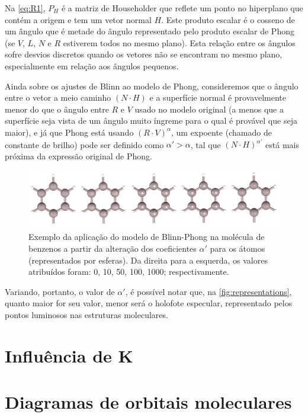 Na \autoref{eq:R1}, $P_H$ é a matriz de Householder que reflete um ponto no hiperplano que contém a origem e tem um vetor normal $H$. Este produto escalar é o cosseno de um ângulo que é metade do ângulo representado pelo produto escalar de Phong (se $V$, $L$, $N$ e $R$ estiverem todos no mesmo plano). Esta relação entre os ângulos sofre desvios discretos quando os vetores não se encontram no mesmo plano, especialmente em relação aos ângulos pequenos.

Ainda sobre os ajustes de Blinn ao modelo de Phong, consideremos que o ângulo entre o vetor a meio caminho $(N \cdot H)$ e a superfície normal é provavelmente menor do que o ângulo entre $R$ e $V$ usado no modelo original (a menos que a superfície seja vista de um ângulo muito íngreme para o qual é provável que seja maior), e já que Phong está usando $(R \cdot V)^\alpha$, um expoente (chamado de constante de brilho) pode ser definido como $\alpha' > \alpha$, tal que $(N \cdot H)^{\alpha'}$ está mais próxima da expressão original de Phong.

\begin{figure}[htb]
\caption{\label{fig:representations} Exemplo da aplicação do modelo de Blinn-Phong na molécula de benzenos a partir da alteração dos coeficientes $\alpha'$ para os átomos (representados por esferas). Da direita para a esquerda, os valores atribuídos foram: 0, 10, 50, 100, 1000; respectivamente.}
	\begin{center}
		\includegraphics[width=1.0\textwidth]{images/shininess(1).png}
	\end{center}
\end{figure}

Variando, portanto, o valor de $\alpha'$, é possível notar que, na \autoref{fig:representations}, quanto maior for seu valor, menor será o holofote especular, representado pelos pontos luminosos nas estruturas moleculares.

\section{Influência de K}

\section{Diagramas de orbitais moleculares}

